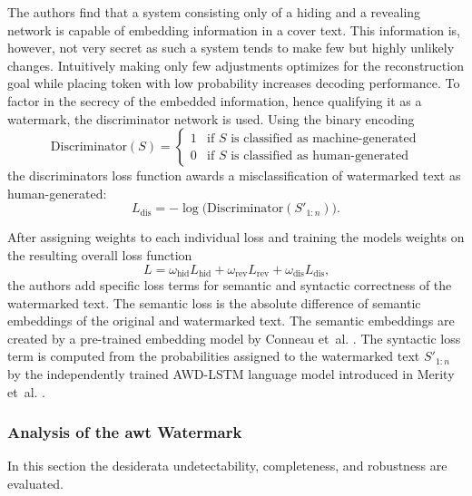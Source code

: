    The authors find that a system consisting only of a hiding and a revealing network is capable of embedding information in a cover text.
    This information is, however, not very secret as such a system tends to make few but highly unlikely changes.
    Intuitively making only few adjustments optimizes for the reconstruction goal while placing token with low probability increases decoding performance.
    To factor in the secrecy of the embedded information, hence qualifying it as a watermark, the discriminator network is used.
    Using the binary encoding
    \begin{equation}
        \mathrm{Discriminator}(S) = 
            \begin{cases}
                1 & \text{if $S$ is classified as machine-generated} \\
                0 & \text{if $S$ is classified as human-generated}
            \end{cases}
    \end{equation}
    the discriminators loss function awards a misclassification of watermarked text as human-generated:
    \begin{equation}
        L_{\mathrm{dis}} = -\log \big( \mathrm{Discriminator}(S'_{1:n}) \big) \text{.}
    \end{equation}

    After assigning weights to each individual loss and training the models weights on the resulting overall loss function
    \begin{equation}
    \label{eq:awtLoss}
        L = \omega_{\mathrm{hid}} L_{\mathrm{hid}} + \omega_{\mathrm{rev}} L_{\mathrm{rev}} + \omega_{\mathrm{dis}} L_{\mathrm{dis}} \text{,}
    \end{equation}
    the authors add specific loss terms for semantic and syntactic correctness of the watermarked text.
    The semantic loss is the absolute difference of semantic embeddings of the original and watermarked text.
    The semantic embeddings are created by a pre-trained embedding model by Conneau et~al. \cite{conneau2018supervised}.
    The syntactic loss term is computed from the probabilities assigned to the watermarked text $S'_{1:n}$ by the independently trained AWD-LSTM language model introduced in Merity et~al. \cite{merity2016pointer}.
    
    \subsubsection{Analysis of the \ac{awt} Watermark}
    In this section the desiderata undetectability, completeness, and robustness are evaluated.

